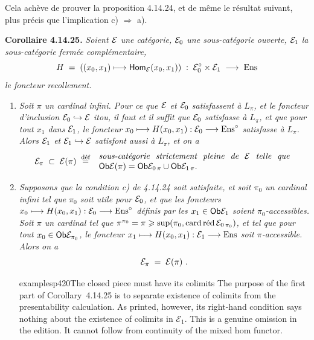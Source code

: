 Cela achève de prouver la proposition 4.14.24, et de même le résultat suivant, plus précis que l'implication c) $\Longrightarrow$ a).

\textbf{Corollaire 4.14.25.} \textit{Soient $\cE$ une catégorie, $\cE_0$ une sous-catégorie ouverte, $\cE_1$ la sous-catégorie fermée complémentaire,}
\[
H \;=\; ((x_0,x_1) \longmapsto \Hom_{\cE}(x_0,x_1)) \;:\; \cE_0^\circ \times \cE_1 \;\longrightarrow\; \Ens
\]
\textit{le foncteur recollement.}
\begin{enumerate}
\item[\textit{1°)}] \textit{Soit $\pi$ un cardinal infini. Pour ce que $\cE$ et $\cE_0$ satisfassent à $L_\pi$, et le foncteur d'inclusion $\cE_0 \hookrightarrow \cE$ itou, il faut et il suffit que $\cE_0$ satisfasse à $L_\pi$, et que pour tout $x_1$ dans $\cE_1$, le foncteur $x_0 \longmapsto H(x_0,x_1) : \cE_0 \longrightarrow \Ens^\circ$ satisfasse à $L_\pi$. Alors $\cE_1$ et $\cE_1 \hookrightarrow \cE$ satisfont aussi à $L_\pi$,}
\textit{et on a}
\[
\cE_\pi \;\subset\; \cE(\pi) \;\defeq\;
\begin{array}{l}
\text{\itshape sous-catégorie\ \ strictement\ \ pleine\ \ de\ \ $\cE$\ \ telle\ \ que}\\
\Ob\cE(\pi) = \Ob\cE_{0\,\pi} \cup \Ob\cE_{1\,\pi}.
\end{array}
\]
\item[\textit{2°)}] \textit{Supposons que la condition c) de 4.14.24 soit satisfaite, et soit $\pi_0$ un cardinal infini tel que $\pi_0$ soit utile pour $\cE_0$, et que les foncteurs $x_0 \longmapsto H(x_0,x_1) : \cE_0 \longrightarrow \Ens^\circ$ définis par les $x_1 \in \Ob\cE_1$ soient $\pi_0$-accessibles. Soit $\pi$ un cardinal tel que $\pi^{\pi_0} = \pi \geqslant \sup(\pi_0, \cardred\cE_{0\,\pi_0})$, et tel que pour tout $x_0 \in \Ob\cE_{\pi_0}$, le foncteur $x_1 \longmapsto H(x_0,x_1) : \cE_1 \longrightarrow \Ens$ soit $\pi$-accessible. Alors on a}
\[
\cE_\pi \;=\; \cE(\pi)\ .
\]

\begin{dcomment}{examples}{p420}{The closed piece must have its colimits}
The purpose of the first part of Corollary~4.14.25 is to separate existence of colimits from the presentability calculation. As printed, however, its right-hand condition says nothing about the existence of colimits in $\mathcal E_1$. This is a genuine omission in the edition. It cannot follow from continuity of the mixed hom functor.


\end{dcomment}
\end{enumerate}
